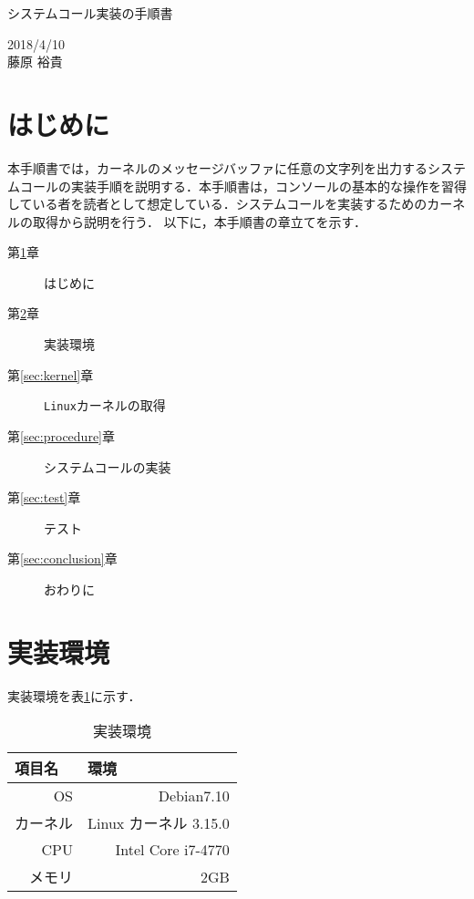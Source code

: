 \documentclass[12pt]{jsarticle}
\begin{document}
\begin{center}
{\LARGE システムコール実装の手順書}
\end{center}

\begin{flushright}
  2018/4/10\\
 藤原 裕貴
\end{flushright}
\section{はじめに}\label{sec:introduction}
本手順書では，カーネルのメッセージバッファに任意の文字列を出力するシステムコールの実装手順を説明する．本手順書は，コンソールの基本的な操作を習得している者を読者として想定している．システムコールを実装するためのカーネルの取得から説明を行う．
以下に，本手順書の章立てを示す．

\begin{description}
\item [第\ref{sec:introduction}章] はじめに
\item [第\ref{sec:env}章] 実装環境 
\item [第\ref{sec:kernel}章] \verb|Linux|カーネルの取得
\item [第\ref{sec:procedure}章] システムコールの実装
\item [第\ref{sec:test}章] テスト
\item [第\ref{sec:conclusion}章] おわりに



\end{description}

\section{実装環境}\label{sec:env}
実装環境を表\ref{tab:env}に示す．

\begin{table}[h]
  \begin{center}
    \caption{実装環境}\label{tab:env}
    \begin{tabular}{r|r}
      \hline\hline
      \multicolumn{1}{l|}{項目名} & \multicolumn{1}{l}{環境} \\
      \hline
      OS & Debian7.10 \\
      カーネル & Linux カーネル 3.15.0 \\
      CPU & Intel Core i7-4770 \\
      メモリ & 2GB  \\
      \hline
    \end{tabular}
  \end{center}
\end{table}
\end{document}
